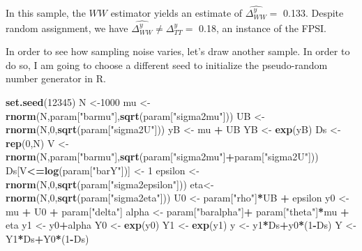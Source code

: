 \documentclass[]{book}
\newenvironment{Shaded}{\begin{snugshade}}{\end{snugshade}}
\newcommand{\KeywordTok}[1]{\textcolor[rgb]{0.13,0.29,0.53}{\textbf{#1}}}
\newcommand{\DecValTok}[1]{\textcolor[rgb]{0.00,0.00,0.81}{#1}}
\newcommand{\StringTok}[1]{\textcolor[rgb]{0.31,0.60,0.02}{#1}}
\newcommand{\OperatorTok}[1]{\textcolor[rgb]{0.81,0.36,0.00}{\textbf{#1}}}
\newcommand{\NormalTok}[1]{#1}
\theoremstyle{definition}
\theoremstyle{definition}
\theoremstyle{definition}
\theoremstyle{remark}
\begin{document}
In this sample, the \(WW\) estimator yields an estimate of
\(\hat{\Delta^y_{WW}}=\) 0.133. Despite random assignment, we have
\(\hat{\Delta^y_{WW}}\neq\Delta^y_{TT}=\) 0.18, an instance of the FPSI.

In order to see how sampling noise varies, let's draw another sample. In
order to do so, I am going to choose a different seed to initialize the
pseudo-random number generator in R.

\begin{Shaded}
\begin{Highlighting}[]
\KeywordTok{set.seed}\NormalTok{(}\DecValTok{12345}\NormalTok{)}
\NormalTok{N <-}\DecValTok{1000}
\NormalTok{mu <-}\StringTok{ }\KeywordTok{rnorm}\NormalTok{(N,param[}\StringTok{"barmu"}\NormalTok{],}\KeywordTok{sqrt}\NormalTok{(param[}\StringTok{"sigma2mu"}\NormalTok{]))}
\NormalTok{UB <-}\StringTok{ }\KeywordTok{rnorm}\NormalTok{(N,}\DecValTok{0}\NormalTok{,}\KeywordTok{sqrt}\NormalTok{(param[}\StringTok{"sigma2U"}\NormalTok{]))}
\NormalTok{yB <-}\StringTok{ }\NormalTok{mu }\OperatorTok{+}\StringTok{ }\NormalTok{UB }
\NormalTok{YB <-}\StringTok{ }\KeywordTok{exp}\NormalTok{(yB)}
\NormalTok{Ds <-}\StringTok{ }\KeywordTok{rep}\NormalTok{(}\DecValTok{0}\NormalTok{,N)}
\NormalTok{V <-}\StringTok{ }\KeywordTok{rnorm}\NormalTok{(N,param[}\StringTok{"barmu"}\NormalTok{],}\KeywordTok{sqrt}\NormalTok{(param[}\StringTok{"sigma2mu"}\NormalTok{]}\OperatorTok{+}\NormalTok{param[}\StringTok{"sigma2U"}\NormalTok{]))}
\NormalTok{Ds[V}\OperatorTok{<=}\KeywordTok{log}\NormalTok{(param[}\StringTok{"barY"}\NormalTok{])] <-}\StringTok{ }\DecValTok{1} 
\NormalTok{epsilon <-}\StringTok{ }\KeywordTok{rnorm}\NormalTok{(N,}\DecValTok{0}\NormalTok{,}\KeywordTok{sqrt}\NormalTok{(param[}\StringTok{"sigma2epsilon"}\NormalTok{]))}
\NormalTok{eta<-}\StringTok{ }\KeywordTok{rnorm}\NormalTok{(N,}\DecValTok{0}\NormalTok{,}\KeywordTok{sqrt}\NormalTok{(param[}\StringTok{"sigma2eta"}\NormalTok{]))}
\NormalTok{U0 <-}\StringTok{ }\NormalTok{param[}\StringTok{"rho"}\NormalTok{]}\OperatorTok{*}\NormalTok{UB }\OperatorTok{+}\StringTok{ }\NormalTok{epsilon}
\NormalTok{y0 <-}\StringTok{ }\NormalTok{mu }\OperatorTok{+}\StringTok{  }\NormalTok{U0 }\OperatorTok{+}\StringTok{ }\NormalTok{param[}\StringTok{"delta"}\NormalTok{]}
\NormalTok{alpha <-}\StringTok{ }\NormalTok{param[}\StringTok{"baralpha"}\NormalTok{]}\OperatorTok{+}\StringTok{  }\NormalTok{param[}\StringTok{"theta"}\NormalTok{]}\OperatorTok{*}\NormalTok{mu }\OperatorTok{+}\StringTok{ }\NormalTok{eta}
\NormalTok{y1 <-}\StringTok{ }\NormalTok{y0}\OperatorTok{+}\NormalTok{alpha}
\NormalTok{Y0 <-}\StringTok{ }\KeywordTok{exp}\NormalTok{(y0)}
\NormalTok{Y1 <-}\StringTok{ }\KeywordTok{exp}\NormalTok{(y1)}
\NormalTok{y <-}\StringTok{ }\NormalTok{y1}\OperatorTok{*}\NormalTok{Ds}\OperatorTok{+}\NormalTok{y0}\OperatorTok{*}\NormalTok{(}\DecValTok{1}\OperatorTok{-}\NormalTok{Ds)}
\NormalTok{Y <-}\StringTok{ }\NormalTok{Y1}\OperatorTok{*}\NormalTok{Ds}\OperatorTok{+}\NormalTok{Y0}\OperatorTok{*}\NormalTok{(}\DecValTok{1}\OperatorTok{-}\NormalTok{Ds)}
\end{Highlighting}
\end{Shaded}
\end{document}
